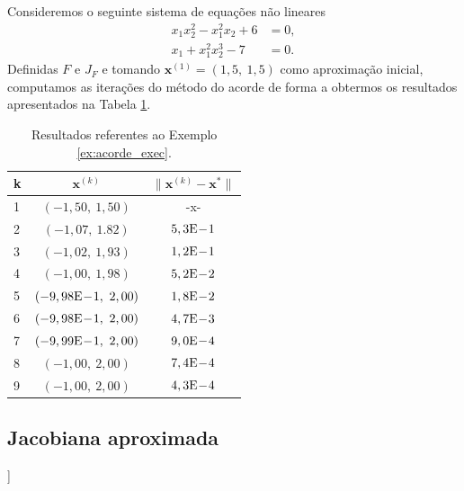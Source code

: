 \begin{ex}\label{ex:acorde_exec}
  Consideremos o seguinte sistema de equações não lineares
  \begin{align}
    x_1x_2^2 - x_1^2x_2 + 6 &= 0,\\
    x_1 + x_1^2x_2^3 - 7 &= 0.
  \end{align}
  Definidas $F$ e $J_F$ e tomando $\pmb{x}^{(1)} = (1,5,~1,5)$ como aproximação inicial, computamos as iterações do método do acorde de forma a obtermos os resultados apresentados na Tabela \ref{tab:ex_acorde_exec}.

  \begin{table}[h!]
    \centering
    \begin{tabular}{lcc}
      k & $\pmb{x}^{(k)}$ & $\|\pmb{x}^{(k)} - \pmb{x}^*\|$\\\hline
      1 & $(-1,50,~1,50)$ & -x- \\
      2 & $(-1,07,~1.82)$ & $5,3\mathrm{E}\!-\!1$ \\
      3 & $(-1,02,~1,93)$ & $1,2\mathrm{E}\!-\!1$ \\
      4 & $(-1,00,~1,98)$ & $5,2\mathrm{E}\!-\!2$ \\
      5 & $(-9,98\mathrm{E}\!-\!1,~2,00)$ & $1,8\mathrm{E}\!-\!2$ \\
      6 & $(-9,98\mathrm{E}\!-\!1,~2,00)$ & $4,7\mathrm{E}\!-\!3$ \\
      7 & $(-9,99\mathrm{E}\!-\!1,~2,00)$ & $9,0\mathrm{E}\!-\!4$ \\
      8 & $(-1,00,~2,00)$ & $7,4\mathrm{E}\!-\!4$ \\
      9 & $(-1,00,~2,00)$ & $4,3\mathrm{E}\!-\!4$ \\\hline
    \end{tabular}
    \caption{Resultados referentes ao Exemplo \ref{ex:acorde_exec}.}
    \label{tab:ex_acorde_exec}
  \end{table}

% 
\end{ex}

\subsection{Jacobiana aproximada}

\begin{flushleft}
  [[tag:revisar]]
\end{flushleft}

